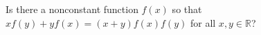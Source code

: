 Is there a nonconstant function $f(x)$ so that $xf(y) + yf(x) = (x + y)f(x)f(y)$ for all $x, y \in \mathbb{R}$?
